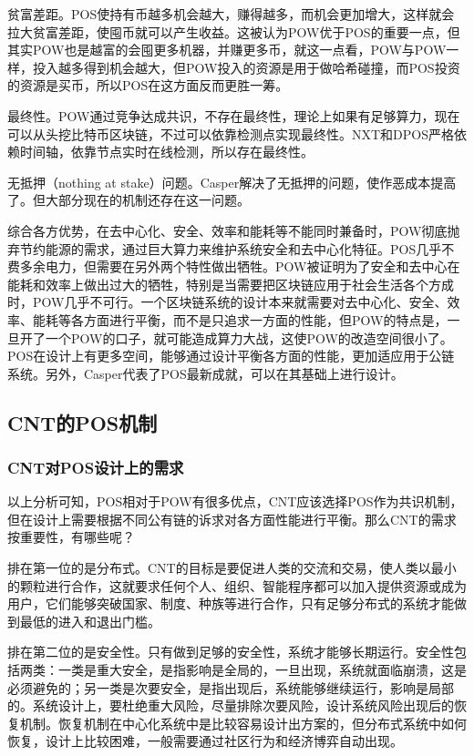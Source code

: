 \documentclass[a4paper,12pt]{article}
\begin{document}
贫富差距。POS使持有币越多机会越大，赚得越多，而机会更加增大，这样就会拉大贫富差距，使囤币就可以产生收益。这被认为POW优于POS的重要一点，但其实POW也是越富的会囤更多机器，并赚更多币，就这一点看，POW与POW一样，投入越多得到机会越大，但POW投入的资源是用于做哈希碰撞，而POS投资的资源是买币，所以POS在这方面反而更胜一筹。

最终性。POW通过竞争达成共识，不存在最终性，理论上如果有足够算力，现在可以从头挖比特币区块链，不过可以依靠检测点实现最终性。NXT和DPOS严格依赖时间轴，依靠节点实时在线检测，所以存在最终性。

无抵押（nothing at stake）问题。Casper解决了无抵押的问题，使作恶成本提高了。但大部分现在的机制还存在这一问题。

综合各方优势，在去中心化、安全、效率和能耗等不能同时兼备时，POW彻底抛弃节约能源的需求，通过巨大算力来维护系统安全和去中心化特征。POS几乎不费多余电力，但需要在另外两个特性做出牺牲。POW被证明为了安全和去中心在能耗和效率上做出过大的牺牲，特别是当需要把区块链应用于社会生活各个方成时，POW几乎不可行。一个区块链系统的设计本来就需要对去中心化、安全、效率、能耗等各方面进行平衡，而不是只追求一方面的性能，但POW的特点是，一旦开了一个POW的口子，就可能造成算力大战，这使POW的改造空间很小了。POS在设计上有更多空间，能够通过设计平衡各方面的性能，更加适应用于公链系统。另外，Casper代表了POS最新成就，可以在其基础上进行设计。

\subsection{CNT的POS机制}

\subsubsection{CNT对POS设计上的需求}

以上分析可知，POS相对于POW有很多优点，CNT应该选择POS作为共识机制，但在设计上需要根据不同公有链的诉求对各方面性能进行平衡。那么CNT的需求按重要性，有哪些呢？

排在第一位的是分布式。CNT的目标是要促进人类的交流和交易，使人类以最小的颗粒进行合作，这就要求任何个人、组织、智能程序都可以加入提供资源或成为用户，它们能够突破国家、制度、种族等进行合作，只有足够分布式的系统才能做到最低的进入和退出门槛。

排在第二位的是安全性。只有做到足够的安全性，系统才能够长期运行。安全性包括两类：一类是重大安全，是指影响是全局的，一旦出现，系统就面临崩溃，这是必须避免的；另一类是次要安全，是指出现后，系统能够继续运行，影响是局部的。系统设计上，要杜绝重大风险，尽量排除次要风险，设计系统风险出现后的恢复机制。恢复机制在中心化系统中是比较容易设计出方案的，但分布式系统中如何恢复，设计上比较困难，一般需要通过社区行为和经济博弈自动出现。
\end{document}
